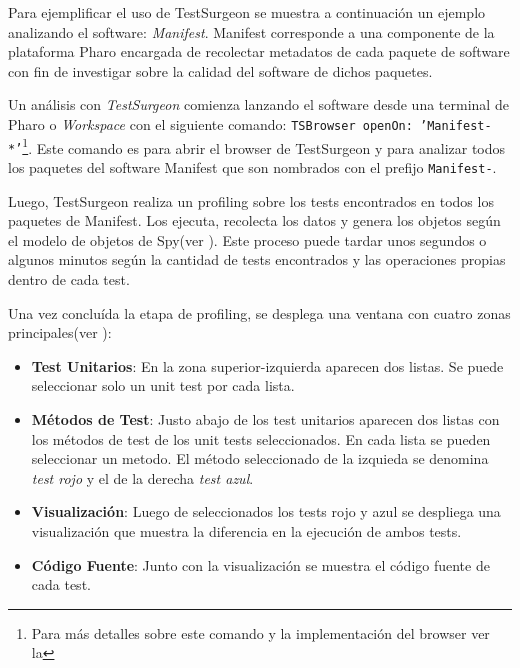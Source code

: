 \par Para ejemplificar el uso de TestSurgeon se muestra a continuación un ejemplo analizando el software: \emph{Manifest}. Manifest corresponde a una componente de la plataforma Pharo encargada de recolectar metadatos de cada paquete de software con fin de investigar sobre la calidad del software de dichos paquetes.
\par Un análisis con \emph{TestSurgeon} comienza lanzando el software desde una terminal de Pharo o \emph{Workspace} con el siguiente comando: {\tt TSBrowser openOn: 'Manifest-*'}\footnote{Para más detalles sobre este comando y la implementación del browser ver la  }. Este comando es para abrir el browser de TestSurgeon y para analizar todos los paquetes del software Manifest que son nombrados con el prefijo {\tt Manifest-}.


\par Luego, TestSurgeon realiza un profiling sobre los tests encontrados en todos los paquetes de Manifest. Los ejecuta, recolecta los datos y genera los objetos según el modelo de objetos de Spy(ver ). Este proceso puede tardar unos segundos o algunos minutos según la cantidad de tests encontrados y las operaciones propias dentro de cada test.

\par Una vez concluída la etapa de profiling, se desplega una ventana con cuatro zonas principales(ver ): 
\begin{itemize}
\item {\bf Test Unitarios}: En la zona superior-izquierda aparecen dos listas. Se puede seleccionar solo un unit test por cada lista.
\item {\bf Métodos de Test}: Justo abajo de los test unitarios aparecen dos listas con los métodos de test de los unit tests seleccionados. En cada lista se pueden seleccionar un metodo. El método seleccionado de la izquieda se denomina \emph{test rojo} y el de la derecha \emph{test azul}.
\item {\bf Visualización}: Luego de seleccionados los tests rojo y azul se despliega una visualización que muestra la diferencia en la ejecución de ambos tests.
\item {\bf Código Fuente}: Junto con la visualización se muestra el código fuente de cada test.
\end{itemize}

